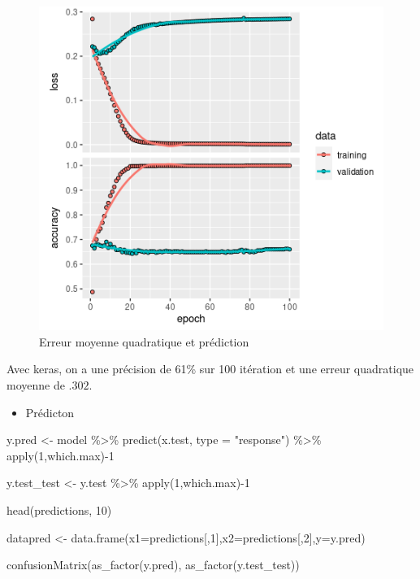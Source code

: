 \documentclass[
  12pt,
]{article}
\newenvironment{Shaded}{\begin{snugshade}}{\end{snugshade}}
\newcommand{\AttributeTok}[1]{\textcolor[rgb]{0.77,0.63,0.00}{#1}}
\newcommand{\DecValTok}[1]{\textcolor[rgb]{0.00,0.00,0.81}{#1}}
\newcommand{\FunctionTok}[1]{\textcolor[rgb]{0.00,0.00,0.00}{#1}}
\newcommand{\NormalTok}[1]{#1}
\newcommand{\OtherTok}[1]{\textcolor[rgb]{0.56,0.35,0.01}{#1}}
\newcommand{\SpecialCharTok}[1]{\textcolor[rgb]{0.00,0.00,0.00}{#1}}
\newcommand{\StringTok}[1]{\textcolor[rgb]{0.31,0.60,0.02}{#1}}
\providecommand{\tightlist}{%
  \setlength{\itemsep}{0pt}\setlength{\parskip}{0pt}}
\begin{document}
\begin{figure}

{\centering \includegraphics[width=1\linewidth]{pictures/keras} 

}

\caption{ Erreur moyenne quadratique et prédiction}\label{fig:keras}
\end{figure}

Avec keras, on a une précision de 61\% sur 100 itération et une erreur
quadratique moyenne de \(.302\).

\begin{itemize}
\tightlist
\item
  Prédicton
\end{itemize}

\begin{Shaded}
\begin{Highlighting}[]
\NormalTok{y.pred  }\OtherTok{\textless{}{-}}\NormalTok{ model }\SpecialCharTok{\%\textgreater{}\%}
  \FunctionTok{predict}\NormalTok{(x.test, }\AttributeTok{type =} \StringTok{"response"}\NormalTok{) }\SpecialCharTok{\%\textgreater{}\%} 
  \FunctionTok{apply}\NormalTok{(}\DecValTok{1}\NormalTok{,which.max)}\SpecialCharTok{{-}}\DecValTok{1}

\NormalTok{y.test\_test }\OtherTok{\textless{}{-}}\NormalTok{ y.test }\SpecialCharTok{\%\textgreater{}\%} 
    \FunctionTok{apply}\NormalTok{(}\DecValTok{1}\NormalTok{,which.max)}\SpecialCharTok{{-}}\DecValTok{1}


\FunctionTok{head}\NormalTok{(predictions, }\DecValTok{10}\NormalTok{)}


\NormalTok{datapred }\OtherTok{\textless{}{-}} \FunctionTok{data.frame}\NormalTok{(}\AttributeTok{x1=}\NormalTok{predictions[,}\DecValTok{1}\NormalTok{],}\AttributeTok{x2=}\NormalTok{predictions[,}\DecValTok{2}\NormalTok{],}\AttributeTok{y=}\NormalTok{y.pred)}

\FunctionTok{confusionMatrix}\NormalTok{(}\FunctionTok{as\_factor}\NormalTok{(y.pred), }\FunctionTok{as\_factor}\NormalTok{(y.test\_test))}
\end{Highlighting}
\end{Shaded}
\end{document}

